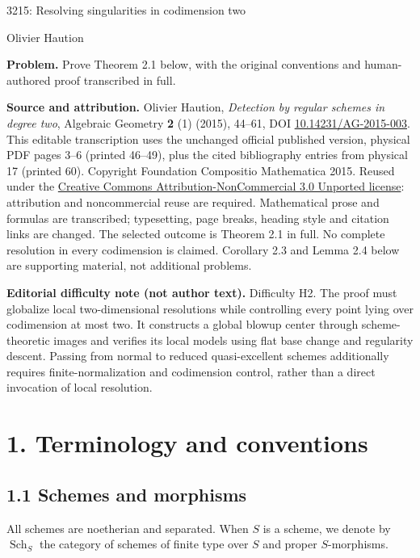 \documentclass[11pt]{article}
\newcommand{\Sch}{\operatorname{Sch}}
\begin{document}
\begin{center}
{\Large 3215: Resolving singularities in codimension two}\par\medskip
Olivier Haution
\end{center}
\noindent\textbf{Problem.} Prove Theorem 2.1 below, with the original conventions and human-authored proof transcribed in full.

\smallskip
\noindent\textbf{Source and attribution.} Olivier Haution, \emph{Detection by regular schemes in degree two}, Algebraic Geometry \textbf{2} (1) (2015), 44--61, DOI \href{https://doi.org/10.14231/AG-2015-003}{10.14231/AG-2015-003}. This editable transcription uses the unchanged official published version, physical PDF pages 3--6 (printed 46--49), plus the cited bibliography entries from physical 17 (printed 60). Copyright Foundation Compositio Mathematica 2015. Reused under the \href{https://creativecommons.org/licenses/by-nc/3.0/}{Creative Commons Attribution-NonCommercial 3.0 Unported license}: attribution and noncommercial reuse are required. Mathematical prose and formulas are transcribed; typesetting, page breaks, heading style and citation links are changed. The selected outcome is Theorem 2.1 in full. No complete resolution in every codimension is claimed. Corollary 2.3 and Lemma 2.4 below are supporting material, not additional problems.

\noindent\textbf{Editorial difficulty note (not author text).} Difficulty H2. The proof must globalize local two-dimensional resolutions while controlling every point lying over codimension at most two. It constructs a global blowup center through scheme-theoretic images and verifies its local models using flat base change and regularity descent. Passing from normal to reduced quasi-excellent schemes additionally requires finite-normalization and codimension control, rather than a direct invocation of local resolution.

\section*{1. Terminology and conventions}
\subsection*{1.1 Schemes and morphisms}
All schemes are noetherian and separated. When $S$ is a scheme, we denote by $\Sch_S$ the category of schemes of finite type over $S$ and proper $S$-morphisms.
\end{document}
